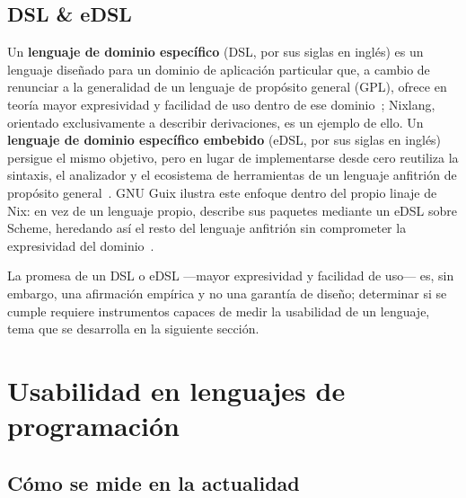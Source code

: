 \subsection{DSL \& eDSL}

Un \textbf{lenguaje de dominio específico} (DSL, por sus siglas en inglés) es un lenguaje diseñado para un dominio de aplicación particular que, a cambio de renunciar a la generalidad de un lenguaje de propósito general (GPL), ofrece en teoría mayor expresividad y facilidad de uso dentro de ese dominio~\cite{Mernik2005,vandeursenDomainspecificLanguagesAnnotated2000}; Nixlang, orientado exclusivamente a describir derivaciones, es un ejemplo de ello. Un \textbf{lenguaje de dominio específico embebido} (eDSL, por sus siglas en inglés) persigue el mismo objetivo, pero en lugar de implementarse desde cero reutiliza la sintaxis, el analizador y el ecosistema de herramientas de un lenguaje anfitrión de propósito general~\cite{berzakEmbeddedDomainSpecific}. GNU Guix ilustra este enfoque dentro del propio linaje de Nix: en vez de un lenguaje propio, describe sus paquetes mediante un eDSL sobre Scheme, heredando así el resto del lenguaje anfitrión sin comprometer la expresividad del dominio~\cite{Courts2013}.

La promesa de un DSL o eDSL ---mayor expresividad y facilidad de uso--- es, sin embargo, una afirmación empírica y no una garantía de diseño; determinar si se cumple requiere instrumentos capaces de medir la usabilidad de un lenguaje, tema que se desarrolla en la siguiente sección.

\section{Usabilidad en lenguajes de programación}

\subsection{Cómo se mide en la actualidad}

